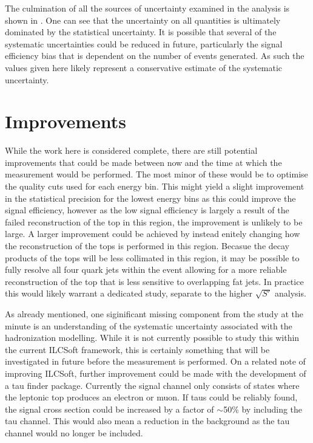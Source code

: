 The culmination of all the sources of uncertainty examined in the analysis is shown in . One can see that the uncertainty on all quantities is ultimately dominated by the statistical uncertainty. It is possible that several of the systematic uncertainties could be reduced in future, particularly the signal efficiency bias that is dependent on the number of events generated. As such the values given here likely represent a conservative estimate of the systematic uncertainty.


\section{Improvements}

While the work here is considered complete, there are still potential improvements that could be made between now and the time at which the measurement would be performed. The most minor of these would be to optimise the quality cuts used for each energy bin. This might yield a slight improvement in the statistical precision for the lowest energy bins as this could improve the signal efficiency, however as the low signal efficiency is largely a result of the failed reconstruction of the top in this region, the improvement is unlikely to be large. A larger improvement could be achieved by instead enitely changing how the reconstruction of the tops is performed in this region. Becasue the decay products of the tops will be less collimated in this region, it may be possible to fully resolve all four quark jets within the event allowing for a more reliable reconstruction of the top that is less sensitive to overlapping fat jets. In practice this would likely warrant a dedicated study, separate to the higher $\sqrt{S'}$ analysis.

As already mentioned, one siginificant missing component from the study at the minute is an understanding of the systematic uncertainty associated with the hadronization modelling. While it is not currently possible to study this within the current ILCSoft framework, this is certainly something that will be investigated in future before the measurement is performed. On a related note of improving ILCSoft, further improvement could be made with the development of a tau finder package. Currently the signal channel only consists of states where the leptonic top produces an electron or muon. If taus could be reliably found, the signal cross section could be increased by a factor of $\sim$50\% by including the tau channel. This would also mean a reduction in the background as the tau channel would no longer be included. 

